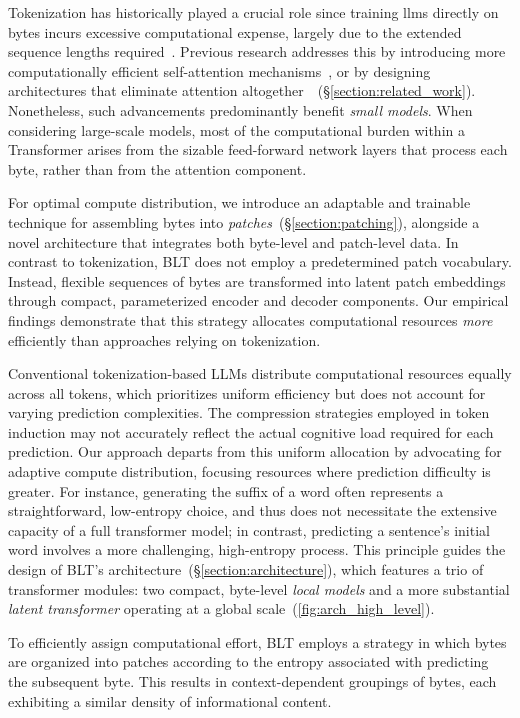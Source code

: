 Tokenization has historically played a crucial role since training llms directly on bytes incurs excessive computational expense, largely due to the extended sequence lengths required~\citep{xue2022byt5}. Previous research addresses this by introducing more computationally efficient self-attention mechanisms~\citep{el2020characterbert, clark2022canine}, or by designing architectures that eliminate attention altogether~\citep{wang2024mambabyte}~(\S\ref{section:related_work}). Nonetheless, such advancements predominantly benefit \textit{small models}. When considering large-scale models, most of the computational burden within a Transformer arises from the sizable feed-forward network layers that process each byte, rather than from the attention component.

For optimal compute distribution, we introduce an adaptable and trainable technique for assembling bytes into \textit{patches}~(\S\ref{section:patching}), alongside a novel architecture that integrates both byte-level and patch-level data. In contrast to tokenization, {\textsc BLT} does not employ a predetermined patch vocabulary. Instead, flexible sequences of bytes are transformed into latent patch embeddings through compact, parameterized encoder and decoder components. Our empirical findings demonstrate that this strategy allocates computational resources \textit{more} efficiently than approaches relying on tokenization.

Conventional tokenization-based LLMs distribute computational resources equally across all tokens, which prioritizes uniform efficiency but does not account for varying prediction complexities. The compression strategies employed in token induction may not accurately reflect the actual cognitive load required for each prediction. Our approach departs from this uniform allocation by advocating for adaptive compute distribution, focusing resources where prediction difficulty is greater. For instance, generating the suffix of a word often represents a straightforward, low-entropy choice, and thus does not necessitate the extensive capacity of a full transformer model; in contrast, predicting a sentence’s initial word involves a more challenging, high-entropy process. This principle guides the design of {\textsc BLT}'s architecture~(\S\ref{section:architecture}), which features a trio of transformer modules: two compact, byte-level \textit{local models} and a more substantial \textit{latent transformer} operating at a global scale~(\autoref{fig:arch_high_level}). 

To efficiently assign computational effort, {\textsc BLT} employs a strategy in which bytes are organized into patches according to the entropy associated with predicting the subsequent byte. This results in context-dependent groupings of bytes, each exhibiting a similar density of informational content.

